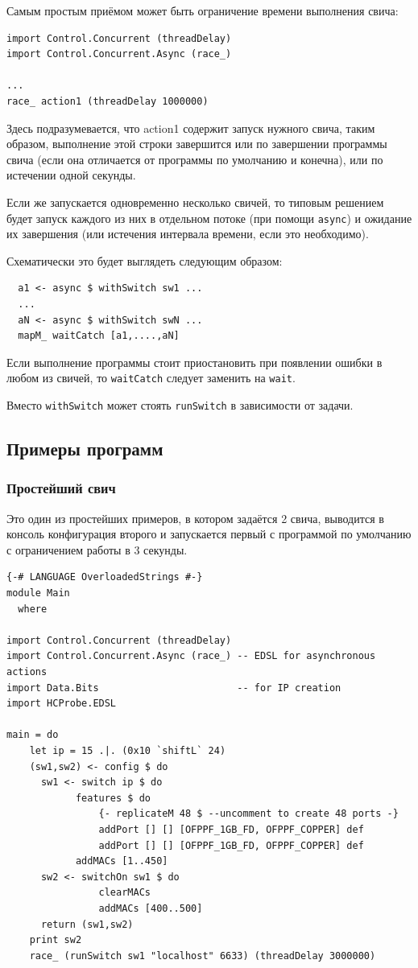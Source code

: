 \documentclass[9pt,a4paper]{article}
\begin{document}
Самым простым приёмом может быть ограничение времени выполнения свича:

\begin{lstlisting}
import Control.Concurrent (threadDelay)
import Control.Concurrent.Async (race_)

...
race_ action1 (threadDelay 1000000)
\end{lstlisting}

Здесь подразумевается, что action1 содержит запуск нужного свича, таким образом,
выполнение этой строки завершится или по завершении программы свича (если она
отличается от программы по умолчанию и конечна), или по истечении одной секунды.

Если же запускается одновременно несколько свичей, то типовым решением будет
запуск каждого из них в отдельном потоке (при помощи \lstinline!async!) и
ожидание их завершения (или истечения интервала времени, если это необходимо).

Схематически это будет выглядеть следующим образом:

\begin{lstlisting}
  a1 <- async $ withSwitch sw1 ...
  ...
  aN <- async $ withSwitch swN ...
  mapM_ waitCatch [a1,....,aN]
\end{lstlisting}

Если выполнение программы стоит приостановить при появлении ошибки в любом из
свичей, то \lstinline!waitCatch! следует заменить на \lstinline!wait!.

Вместо \lstinline!withSwitch! может стоять \lstinline!runSwitch!
в зависимости от задачи.

\subsection{Примеры программ}

\subsubsection{Простейший свич}

Это один из простейших примеров, в котором задаётся 2 свича, выводится в консоль
конфигурация второго и запускается первый с программой по умолчанию с
ограничением работы в 3 секунды.

\begin{lstlisting}
{-# LANGUAGE OverloadedStrings #-}
module Main
  where

import Control.Concurrent (threadDelay)
import Control.Concurrent.Async (race_) -- EDSL for asynchronous actions
import Data.Bits                        -- for IP creation
import HCProbe.EDSL

main = do 
    let ip = 15 .|. (0x10 `shiftL` 24)
    (sw1,sw2) <- config $ do
      sw1 <- switch ip $ do
            features $ do
                {- replicateM 48 $ --uncomment to create 48 ports -}
                addPort [] [] [OFPPF_1GB_FD, OFPPF_COPPER] def
                addPort [] [] [OFPPF_1GB_FD, OFPPF_COPPER] def
            addMACs [1..450]
      sw2 <- switchOn sw1 $ do
                clearMACs 
                addMACs [400..500]
      return (sw1,sw2)
    print sw2
    race_ (runSwitch sw1 "localhost" 6633) (threadDelay 3000000)
\end{lstlisting}
\end{document}
